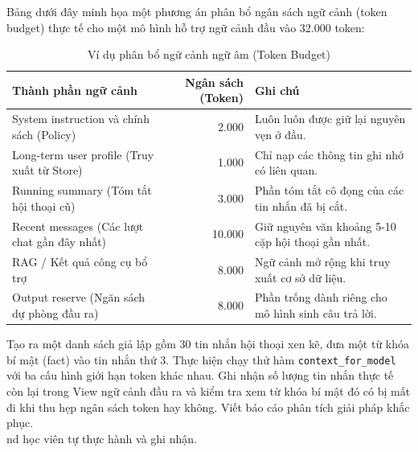 Bảng dưới đây minh họa một phương án phân bổ ngân sách ngữ cảnh (token budget) thực tế cho một mô hình hỗ trợ ngữ cảnh đầu vào 32.000 token:

\begin{table}[H]
\centering
\caption{Ví dụ phân bổ ngữ cảnh ngữ âm (Token Budget)}
\begin{tabular}{p{6.4cm}r p{6cm}}
\toprule
\textbf{Thành phần ngữ cảnh} & \textbf{Ngân sách (Token)} & \textbf{Ghi chú} \\
\midrule
System instruction và chính sách (Policy) & 2.000 & Luôn luôn được giữ lại nguyên vẹn ở đầu. \\
Long-term user profile (Truy xuất từ Store) & 1.000 & Chỉ nạp các thông tin ghi nhớ có liên quan. \\
Running summary (Tóm tắt hội thoại cũ) & 3.000 & Phần tóm tắt cô đọng của các tin nhắn đã bị cắt. \\
Recent messages (Các lượt chat gần đây nhất) & 10.000 & Giữ nguyên văn khoảng 5-10 cặp hội thoại gần nhất. \\
RAG / Kết quả công cụ bổ trợ & 8.000 & Ngữ cảnh mở rộng khi truy xuất cơ sở dữ liệu. \\
Output reserve (Ngăn sách dự phòng đầu ra) & 8.000 & Phần trống dành riêng cho mô hình sinh câu trả lời. \\
\bottomrule
\end{tabular}
\end{table}

\begin{aicheckpoint}
Tạo ra một danh sách giả lập gồm 30 tin nhắn hội thoại xen kẽ, đưa một từ khóa bí mật (fact) vào tin nhắn thứ 3. Thực hiện chạy thử hàm \texttt{context\_for\_model} với ba cấu hình giới hạn token khác nhau. Ghi nhận số lượng tin nhắn thực tế còn lại trong View ngữ cảnh đầu ra và kiểm tra xem từ khóa bí mật đó có bị mất đi khi thu hẹp ngân sách token hay không. Viết báo cáo phân tích giải pháp khắc phục.
\\nd học viên tự thực hành và ghi nhận.
\end{aicheckpoint}
